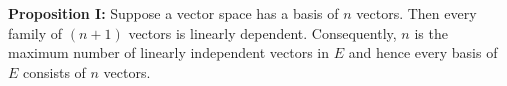 \textbf{Proposition I:} Suppose a vector space has a basis of $n$ vectors. Then every family of $(n+1)$ vectors is linearly dependent. Consequently, $n$ is the maximum number of linearly independent vectors in $E$ and hence every basis of $E$ consists of $n$ vectors.
